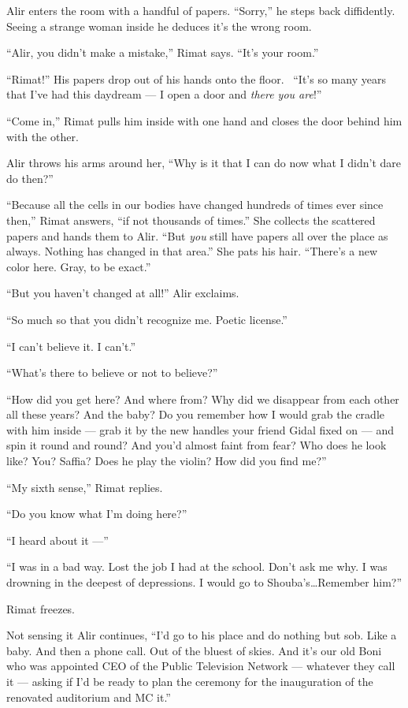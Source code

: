 \documentclass[twoside,11pt,openany]{book}
\begin{document}
Alir enters the room with a handful of papers. ``Sorry,'' he steps back diffidently. Seeing a
strange woman inside he deduces it's the wrong room.

``Alir, you didn't make a mistake,'' Rimat says. ``It's your room.''


``Rimat!'' His papers drop out of his hands onto the floor.~ ``It's so many years
that I've had this daydream --- I open a door and \textit{there you are}!''

``Come in,'' Rimat pulls him inside with one hand and closes the door behind him with the
other.

Alir throws his arms around her, ``Why is it that I can do now what I didn't dare do then?''

``Because all the cells in our bodies have changed hundreds of times ever since then,'' Rimat
answers, ``if not thousands of times.'' She collects the scattered papers and hands them to
Alir. ``But \textit{you} still have papers all over the place as always. Nothing has changed in that
area.'' She pats his hair. ``There's a new color here. Gray, to be exact.''

``But you haven't changed at all!'' Alir exclaims.

``So much so that you didn't recognize me. Poetic license.''

``I can't believe it. I can't.''

``What's there to believe or not to believe?''

``How did you get here? And where from? Why did we disappear from each other all these years? And the baby?
Do you remember how I would grab the cradle with him inside --- grab it by the new handles your friend Gidal
fixed on ---
and spin it round and round? And you'd almost faint from fear? Who does he look like? You? Saffia? Does he play the
violin? How did you find me?''

``My sixth sense,'' Rimat replies.

``Do you know what I'm doing here?''

``I heard about it ---''

``I was in a bad way. Lost the job I had at the school. Don't ask me why. I was drowning in the deepest of
depressions. I would go to Shouba's{\ldots}Remember him?''

Rimat freezes.

Not sensing it Alir continues, ``I'd go to his place and do nothing but sob. Like a baby. And then a phone
call. Out of the bluest of skies. And it's our old Boni who was appointed CEO of the Public Television Network ---
whatever they call it --- asking if I'd be ready to plan the ceremony for the inauguration of the renovated auditorium
and MC it.''
\end{document}

